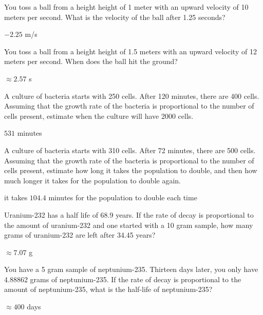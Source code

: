 \begin{exercises}

\begin{exercise}
You toss a ball from a height height of 1 meter with an upward
velocity of 10 meters per second. What is the velocity of the ball
after 1.25 seconds?
\begin{answer}
$-2.25$ m/s
\end{answer}
\end{exercise}

\begin{exercise}
You toss a ball from a height height of 1.5 meters with an upward
velocity of 12 meters per second. When does the ball hit the ground?
\begin{answer}
$\approx 2.57$ s
\end{answer}
\end{exercise}

\begin{exercise}
A culture of bacteria starts with 250 cells. After 120 minutes, there
are 400 cells. Assuming that the growth rate of the bacteria is
proportional to the number of cells present, estimate when the
culture will have 2000 cells.
\begin{answer}
$531$ minutes
\end{answer}
\end{exercise}

\begin{exercise}
A culture of bacteria starts with 310 cells. After 72 minutes, there
are 500 cells. Assuming that the growth rate of the bacteria is
proportional to the number of cells present, estimate how long it takes the
population to double, and then how much longer it takes for the population to double again.
\begin{answer}
it takes $104.4$ minutes for the population to double each time
\end{answer}
\end{exercise}

\begin{exercise}
Uranium-232 has a half life of 68.9 years. If the rate of decay is
proportional to the amount of uranium-232 and one started with a 10
gram sample, how many grams of uranium-232 are left after 34.45 years?
\begin{answer}
$\approx 7.07$ g
\end{answer}
\end{exercise}


\begin{exercise}
You have a 5 gram sample of neptunium-235. Thirteen days later, you only
have 4.88862 grams of neptunium-235. If the rate of decay is proportional
to the amount of neptunium-235, what is the half-life of neptunium-235?
\begin{answer}
$\approx 400$ days
\end{answer}
\end{exercise}


\end{exercises}
